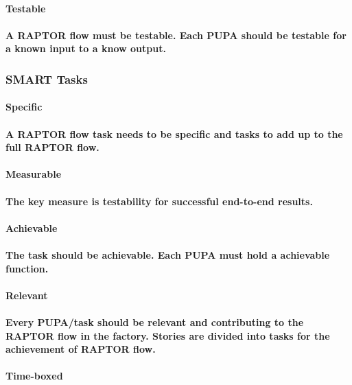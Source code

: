 \paragraph{\textbf{Testable}}
\paragraph{A RAPTOR flow must be testable. Each PUPA should be testable for a known input to a know output.}
\subsubsection{SMART Tasks}
\paragraph{\textbf{Specific}}
\paragraph{A RAPTOR flow task needs to be specific and tasks to add up to the full RAPTOR flow.}
\paragraph{\textbf{Measurable}}
\paragraph{The key measure is testability for successful end-to-end results.}
\paragraph{\textbf{Achievable}}
\paragraph{The task should be achievable. Each PUPA must hold a achievable function.}
\paragraph{\textbf{Relevant}}
\paragraph{Every PUPA/task should be relevant and contributing to the RAPTOR flow in the factory. Stories are divided into tasks for the achievement of RAPTOR flow.}
\paragraph{\textbf{Time-boxed}}
